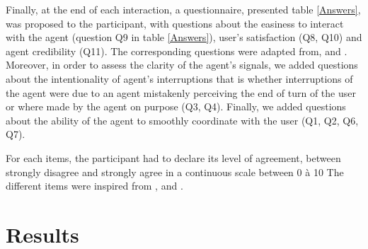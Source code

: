 Finally, at the end of each interaction, a questionnaire, presented table \ref{Answers}, was proposed to the participant, with questions about the easiness to interact with the agent (question Q9 in table \ref{Answers}), user's satisfaction (Q8, Q10) and agent credibility (Q11). The corresponding questions were adapted from\cite{skantze_towards_2010}, \cite{bevacqua_effects_2014} and \cite{de_vault_toward_2015}. Moreover, in order to assess the clarity of the agent's signals, we added questions about the intentionality of agent's interruptions that is whether interruptions of the agent were due to an agent mistakenly perceiving the end of turn of the user or where made by the agent on purpose (Q3, Q4). Finally, we added questions about the ability of the agent to smoothly coordinate with the user (Q1, Q2, Q6, Q7).

For each items, the participant had to declare its level of agreement, between strongly disagree and strongly agree in a continuous scale between 0 à 10 The different items were inspired from \cite{skantze_towards_2010}, \cite{bevacqua_effects_2014} and \cite{de_vault_toward_2015}.

\section{Results}

